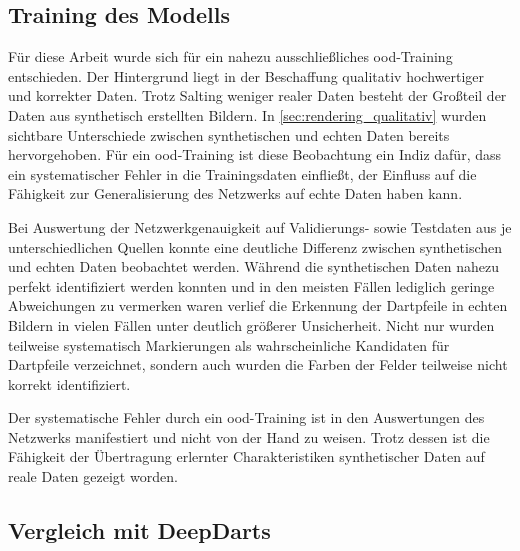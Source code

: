 \subsection{Training des Modells}

Für diese Arbeit wurde sich für ein nahezu ausschließliches \ac{ood}-Training entschieden. Der Hintergrund liegt in der Beschaffung qualitativ hochwertiger und korrekter Daten. Trotz Salting weniger realer Daten besteht der Großteil der Daten aus synthetisch erstellten Bildern. In \autoref{sec:rendering_qualitativ} wurden sichtbare Unterschiede zwischen synthetischen und echten Daten bereits hervorgehoben. Für ein \ac{ood}-Training ist diese Beobachtung ein Indiz dafür, dass ein systematischer Fehler in die Trainingsdaten einfließt, der Einfluss auf die Fähigkeit zur Generalisierung des Netzwerks auf echte Daten haben kann.

Bei Auswertung der Netzwerkgenauigkeit auf Validierungs- sowie Testdaten aus je unterschiedlichen Quellen konnte eine deutliche Differenz zwischen synthetischen und echten Daten beobachtet werden. Während die synthetischen Daten nahezu perfekt identifiziert werden konnten und in den meisten Fällen lediglich geringe Abweichungen zu vermerken waren verlief die Erkennung der Dartpfeile in echten Bildern in vielen Fällen unter deutlich größerer Unsicherheit. Nicht nur wurden teilweise systematisch Markierungen als wahrscheinliche Kandidaten für Dartpfeile verzeichnet, sondern auch wurden die Farben der Felder teilweise nicht korrekt identifiziert.

Der systematische Fehler durch ein \ac{ood}-Training ist in den Auswertungen des Netzwerks manifestiert und nicht von der Hand zu weisen. Trotz dessen ist die Fähigkeit der Übertragung erlernter Charakteristiken synthetischer Daten auf reale Daten gezeigt worden.


\subsection{Vergleich mit DeepDarts}

